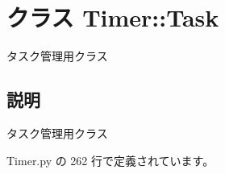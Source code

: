 \section{クラス Timer::Task}
\label{classsource__py_1_1_timer_1_1_timer_1_1_task}
タスク管理用クラス  




\subsection{説明}
タスク管理用クラス 

 Timer.py の 262 行で定義されています。